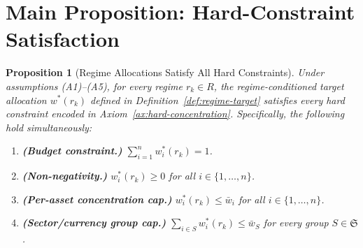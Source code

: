 \documentclass[12pt,openany]{book}
\newcommand{\bfw}{\mathbf{w}}
\numberwithin{equation}{chapter}
\theoremstyle{plain}
\newtheorem{proposition}[theorem]{Proposition}
\theoremstyle{definition}
\theoremstyle{remark}
\def\mathcal#1{#1}%
\def\bfw{w}%
\begin{document}
\section{Main Proposition: Hard-Constraint Satisfaction}
\label{sec:regime-hard}

\begin{proposition}[Regime Allocations Satisfy All Hard Constraints]
\label{prop:regime-hard}
Under assumptions \textup{(A1)--(A5)}, for every regime
$r_k \in \mathcal{R}$, the regime-conditioned target allocation
$\bfw^{*}(r_k)$ defined in Definition~\ref{def:regime-target}
satisfies every hard constraint encoded in
Axiom~\ref{ax:hard-concentration}.  Specifically, the following
hold simultaneously:
\begin{enumerate}
  \item \textbf{(Budget constraint.)}
        $\displaystyle\sum_{i=1}^{n} w_i^{*}(r_k) = 1$.

  \item \textbf{(Non-negativity.)}
        $w_i^{*}(r_k) \geq 0$ for all $i \in \{1,\dots,n\}$.

  \item \textbf{(Per-asset concentration cap.)}
        $w_i^{*}(r_k) \leq \bar{w}_i$ for all
        $i \in \{1,\dots,n\}$.

  \item \textbf{(Sector/currency group cap.)}
        $\displaystyle\sum_{i \in \mathcal{S}} w_i^{*}(r_k)
        \leq \bar{w}_{\mathcal{S}}$
        for every group $\mathcal{S} \in \mathfrak{S}$.
\end{enumerate}
\end{proposition}
\end{document}
